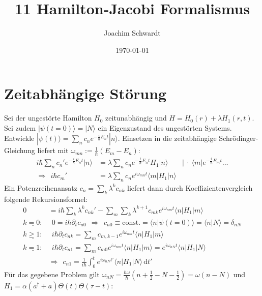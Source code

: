 \documentclass[a4paper,12pt]{article}
\newcommand{\brak}{}
\newcommand{\braket}{}
\newcommand{\intx}{}
\newcommand{\kla}{}
\newcommand{\tecxt}{}
\newcommand{\Bra}{}
\newcommand{\Ket}{}
\begin{document}
\title{11 Hamilton-Jacobi Formalismus}
\author{Joachim Schwardt}
\date{\today}
\maketitle

\section{Zeitabhängige Störung}
Sei der ungestörte Hamilton $H_0$ zeitunabhängig und $H=H_0(r)+\lambda H_1(r,t)$. Sei zudem $\Ket | {\psi(t=0)} \rangle=\Ket | {N} \rangle$ ein Eigenzustand des ungestörten Systems. Entwickle $\Ket | {\psi(t)} \rangle=\sum_nc_ne^{-\frac{i}{\hbar}E_nt}\Ket | {n} \rangle$. Einsetzen in die zeitabhängige Schrödinger-Gleichung liefert mit $\omega_{mn}:=\frac{1}{\hbar}\kla\left( {E_m-E_n} \right)$:
\begin{align*}
i\hbar\sum_nc_n'e^{-\frac{i}{\hbar}E_nt}\Ket | {n} \rangle&=\lambda\sum_nc_ne^{-\frac{i}{\hbar}E_nt}H_1\Ket | {n} \rangle &\big\vert\ \cdot\ \Bra\langle {m} |e^{-\frac{i}{\hbar}E_mt}\dots\\
\Rightarrow\ \ i\hbar c_m'&=\lambda\sum_nc_ne^{i\omega_{mn}t}\braket\langle {m} | {H_1} | {n}\rangle
\end{align*}
Ein Potenzreihenansatz $c_n=\sum_k\lambda^kc_{nk}$ liefert dann durch Koeffizientenvergleich folgende Rekursionsformel:
\begin{align*}
0&=i\hbar\sum_k\lambda^kc_{nk}'-\sum_m\sum_k\lambda^{k+1}c_{mk}e^{i\omega_{nm}t}\braket\langle {n} | {H_1} | {m}\rangle\\
\underline{k=0:}&\ \ 0=i\hbar\partial_tc_{n0}\ \ \Rightarrow\ \ c_{n0}\equiv\tecxt\text{const.}=\brak\langle {n}| {\psi(t=0)}\rangle=\brak\langle {n}| {N}\rangle=\delta_{nN}\\
\underline{k\ge 1:}&\ \ i\hbar\partial_tc_{nk}=\sum_mc_{m,k-1}e^{i\omega_{nm}t}\braket\langle {n} | {H_1} | {m}\rangle\\
\underline{k= 1:}&\ \ i\hbar\partial_tc_{n1}=\sum_mc_{m0}e^{i\omega_{nm}t}\braket\langle {n} | {H_1} | {m}\rangle=e^{i\omega_{nN}t}\braket\langle {n} | {H_1} | {N}\rangle\\
&\Rightarrow\ \ c_{n1}=\frac{1}{i\hbar}\intx\int_{0}^{t}e^{i\omega_{nN}t'}\braket\langle {n} | {H_1} | {N}\rangle\,\mathrm{d}t'
\end{align*}
Für das gegebene Problem gilt $\omega_{nN}=\frac{\hbar\omega}{\hbar}\kla\left( {n+\frac{1}{2}-N-\frac{1}{2}} \right)=\omega (n-N)$ und $H_1=\alpha\kla\left( {a^\dagger + a} \right)\Theta(t)\Theta(\tau -t)$:
\end{document}
